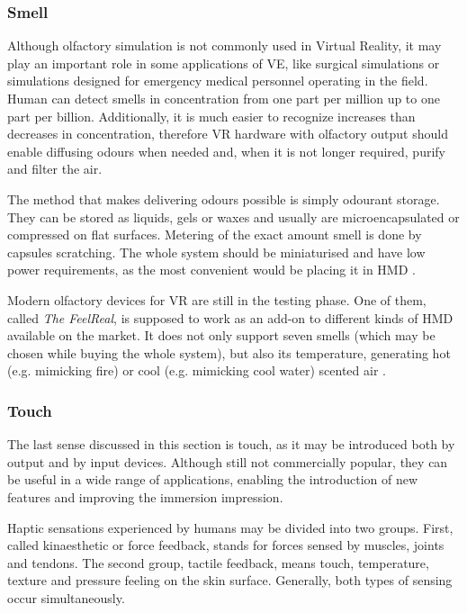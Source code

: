  \subsubsection{Smell}
Although olfactory simulation is not commonly used in Virtual Reality, it may play an important role in some applications of VE, like surgical simulations or simulations designed for emergency medical personnel operating in the field. Human can detect smells in concentration from one part per million up to one part per billion. Additionally, it is much easier to recognize increases than decreases in concentration, therefore VR hardware with olfactory output should enable diffusing odours when needed and, when it is not longer required, purify and filter the air.

The method that makes delivering odours possible is simply odourant storage. They can be stored as liquids, gels or waxes and usually are microencapsulated or compressed on flat surfaces. Metering of the exact amount smell is done by capsules scratching. The whole system should be miniaturised and have low power requirements, as the most convenient would be placing it in HMD \cite{Gobbetti99}. 

Modern olfactory devices for VR are still in the testing phase. One of them, called \textit{The FeelReal}, is supposed to work as an add-on to different kinds of HMD available on the market. It does not only support seven smells (which may be chosen while buying the whole system), but also its temperature, generating hot (e.g. mimicking fire) or cool (e.g. mimicking cool water) scented air \cite{Feelreal16}. 
 \subsubsection{Touch}\label{touch}
The last sense discussed in this section is touch, as it may be introduced both by output and by input devices. Although still not commercially popular, they can be useful in a wide range of applications, enabling the introduction of new features and improving the immersion impression. 

Haptic sensations experienced by humans may be divided into two groups. First, called kinaesthetic or force feedback, stands for forces sensed by muscles, joints and tendons.  The second group, tactile feedback, means touch, temperature, texture and pressure feeling on the skin surface. Generally, both types of sensing occur simultaneously. 

